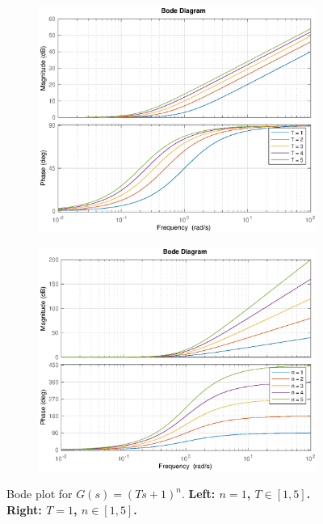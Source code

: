\documentclass[12pt,a4paper]{article}
\begin{document}
\begin{figure}[H]
\hspace{-1.6cm}
\begin{minipage}{0.5\textwidth}
\begin{figure}[H] \centering 
\includegraphics[width=1.2\textwidth]{images/bode_1.eps}
\end{figure}
\end{minipage}\hfill \hspace{-1.6cm}
\begin{minipage}{.5\textwidth}
\begin{figure}[H] \centering
\includegraphics[width=1.2\textwidth]{images/bode_2.eps}
\end{figure}
\end{minipage}
\caption{Bode plot for $G(s) = (Ts+1)^{n}$. \textbf{Left: $n=1$, $T\in [1,5]$. Right: $T=1$, $n\in [1,5]$.}}
\end{figure}
\end{document}
